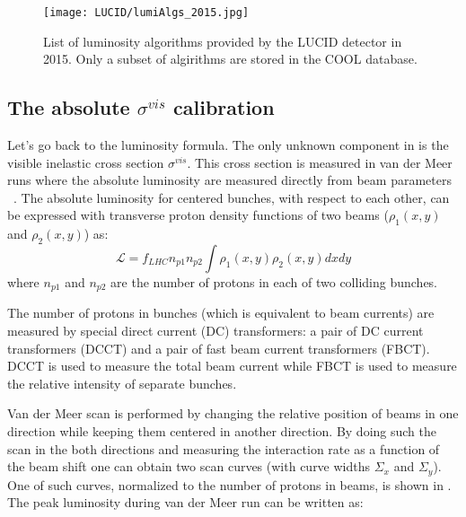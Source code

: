 \begin{figure}
\centering
\texttt{[image: LUCID/lumiAlgs\_2015.jpg]}
\caption{List of luminosity algorithms provided by the LUCID detector in 2015. Only a subset of algirithms are stored in the COOL database.}
\label{fig:InternalConsistency}
\end{figure}

\subsection{The absolute $\sigma^{vis}$ calibration}
\label{subsec:alfa_run}
Let's go back to the luminosity formula. The only unknown component in  is the visible inelastic cross section $\sigma^{vis}$.
This cross section is measured in van der Meer runs where the absolute luminosity are measured directly from beam parameters ~\cite{vanderMeer:296752,Rubbia:1025746}.
The absolute luminosity for centered bunches, with respect to each other, can be expressed with transverse proton density functions of two beams ($\rho_{1}(x,y)$ and $\rho_{2}(x,y)$) as:
\begin{equation}
\mathscr{L} = f_{LHC} n_{p1} n_{p2} \int \rho_{1}(x,y) \rho_{2}(x,y) dx dy
\label{eq:lumi_vs_intensity}
\end{equation}
where $n_{p1}$ and $n_{p2}$ are the number of protons in each of two colliding bunches.

The number of protons in bunches (which is equivalent to beam currents) are measured by special direct current (DC) transformers: 
a pair of DC current transformers (DCCT) and a pair of fast beam current transformers (FBCT). 
DCCT is used to measure the total beam current while FBCT is used to measure the relative intensity of separate bunches.

Van der Meer scan is performed by changing the relative position of beams in one direction while keeping them centered in another direction.
By doing such the scan in the both directions and measuring the interaction rate as a function of the beam shift one can obtain two scan curves (with curve widths $\Sigma_{x}$ and $\Sigma_{y}$). One of such curves, normalized to the number of protons in beams, 
is shown in .
The peak luminosity during van der Meer run can be written as:

